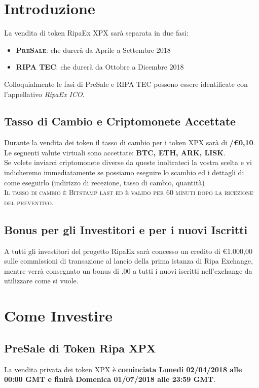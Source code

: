 \documentclass[11pt,fleqn]{book} %
\begin{document}
\section{Introduzione}
La vendita di token RipaEx XPX sarà separata in due fasi:
	\begin{itemize}
		\item \textbf{\textsc{PreSale}}: che durerà da Aprile a Settembre 2018
		\item \textbf{\textsc{RIPA TEC}}: che durerà da Ottobre a Dicembre 2018
	\end{itemize}
\vspace{5mm}
Colloquialmente le fasi di PreSale e RIPA TEC possono essere identificate con l'appellativo \textit{RipaEx ICO}.

\subsection{Tasso di Cambio e Criptomonete Accettate}
Durante la vendita dei token il tasso di cambio per i token XPX sarà di \textbf{\PHP/\euro0,10}.\\

Le seguenti valute virtuali sono accettate: \textbf{BTC, ETH, ARK, LISK}.\\

Se volete inviarci criptomonete diverse da queste inoltrateci la vostra scelta e vi indicheremo immediatamente
se possiamo eseguire lo scambio ed i dettagli di come eseguirlo (indirizzo di recezione, tasso di cambio,
quantità)\\

\textsc{Il tasso di cambio è Bitstamp last ed è valido per 60 minuti dopo la ricezione del preventivo}.

\subsection{Bonus per gli Investitori e per i nuovi Iscritti}
A tutti gli investitori del progetto RipaEx sarà concesso un credito di \euro1.000,00 sulle commissioni
di transazione al lancio della prima istanza di Ripa Exchange, mentre verrà consegnato un bonus di ,00
a tutti i nuovi iscritti nell'exchange da utilizzare come si vuole.

\section{Come Investire}
\subsection{PreSale di Token Ripa XPX}
La vendita privata dei token XPX è \textbf{cominciata Lunedi 02/04/2018 alle 00:00 GMT e finirà Domenica
01/07/2018 alle 23:59 GMT}.
\end{document}
